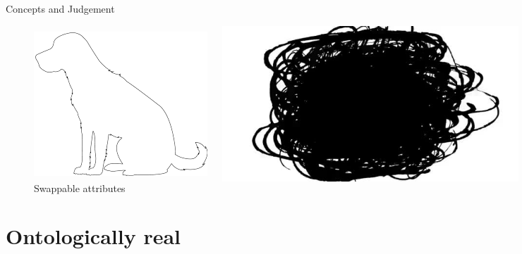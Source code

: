 \documentclass[xcolor=dvipsnames]{beamer}
\begin{document}
\begin{frame}{Concepts and Judgement}
\begin{figure}
  \centering
  \begin{columns}
    \centering
    \caption {Intentional form}
    \includegraphics[width=0.99\textwidth]{dog-outline}
    \centering
    \caption {Swappable attributes}
    \includegraphics[width=0.99\textwidth]{black}
  \end{columns}
\end{figure}
\end{frame}


\section{Ontologically real}
\end{document}
